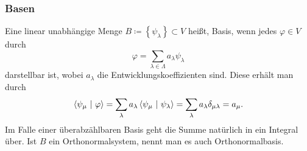 \documentclass[a4paper,12pt,portrait]{book}
\numberwithin{equation}{section}
\begin{document}
\subsubsection{Basen}
Eine linear unabhängige Menge $B\coloneqq\left\lbrace \psi_\lambda\right\rbrace\subset V$ heißt, Basis, wenn jedes $\varphi\in V$ durch 
\begin{equation*}
\varphi= \sum\limits_{\lambda\in\Lambda} a_\lambda \psi_\lambda 
\end{equation*}
darstellbar ist, wobei $a_\lambda$ die Entwicklungskoeffizienten sind. Diese erhält man durch
\begin{equation*}
\left\langle \psi_\mu \ \middle| \ \varphi\right\rangle=\sum\limits_\lambda a_\lambda \left\langle \psi_\mu \ \middle| \ \psi_\lambda\right\rangle=\sum\limits_\lambda a_\lambda\delta_{\mu\lambda}=a_\mu.
\end{equation*}
Im Falle einer überabzählbaren Basis geht die Summe natürlich in ein Integral über. Ist $B$ ein Orthonormalsystem, nennt man es auch Orthonormalbasis.
\end{document}
